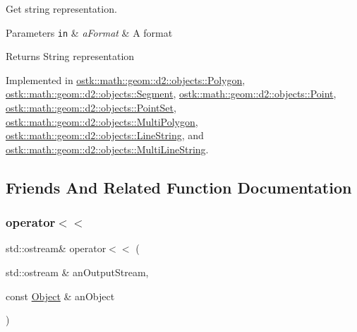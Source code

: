 Get string representation. 


\begin{DoxyParams}[1]{Parameters}
\mbox{\tt in}  & {\em a\+Format} & A format \\
\hline
\end{DoxyParams}
\begin{DoxyReturn}{Returns}
String representation 
\end{DoxyReturn}


Implemented in \hyperlink{classostk_1_1math_1_1geom_1_1d2_1_1objects_1_1_polygon_a6e672ccf5f1101de80e636f097f0a0f7}{ostk\+::math\+::geom\+::d2\+::objects\+::\+Polygon}, \hyperlink{classostk_1_1math_1_1geom_1_1d2_1_1objects_1_1_segment_ac302430065e10f1f281bb8782a904673}{ostk\+::math\+::geom\+::d2\+::objects\+::\+Segment}, \hyperlink{classostk_1_1math_1_1geom_1_1d2_1_1objects_1_1_point_ac8fdaee79af60e2972257e43ff175f12}{ostk\+::math\+::geom\+::d2\+::objects\+::\+Point}, \hyperlink{classostk_1_1math_1_1geom_1_1d2_1_1objects_1_1_point_set_af032e86d9d9dcabe229a015a8361daf2}{ostk\+::math\+::geom\+::d2\+::objects\+::\+Point\+Set}, \hyperlink{classostk_1_1math_1_1geom_1_1d2_1_1objects_1_1_multi_polygon_abf52343dc62ec2d62d971bef636f6c1c}{ostk\+::math\+::geom\+::d2\+::objects\+::\+Multi\+Polygon}, \hyperlink{classostk_1_1math_1_1geom_1_1d2_1_1objects_1_1_line_string_a5312030bced48de68f8902bb6581461d}{ostk\+::math\+::geom\+::d2\+::objects\+::\+Line\+String}, and \hyperlink{classostk_1_1math_1_1geom_1_1d2_1_1objects_1_1_multi_line_string_a87df673d41e16eb2b196c8b8a852d71f}{ostk\+::math\+::geom\+::d2\+::objects\+::\+Multi\+Line\+String}.



\subsection{Friends And Related Function Documentation}
\mbox{\label{classostk_1_1math_1_1geom_1_1d2_1_1_object_a418df9bf4a73078f3d494edef1743f8d}} 
\subsubsection{\texorpdfstring{operator$<$$<$}{operator<<}}
{\footnotesize\ttfamily std\+::ostream\& operator$<$$<$ (\begin{DoxyParamCaption}\item[{std\+::ostream \&}]{an\+Output\+Stream,  }\item[{const \hyperlink{classostk_1_1math_1_1geom_1_1d2_1_1_object}{Object} \&}]{an\+Object }\end{DoxyParamCaption})\hspace{0.3cm}{\ttfamily [friend]}}



